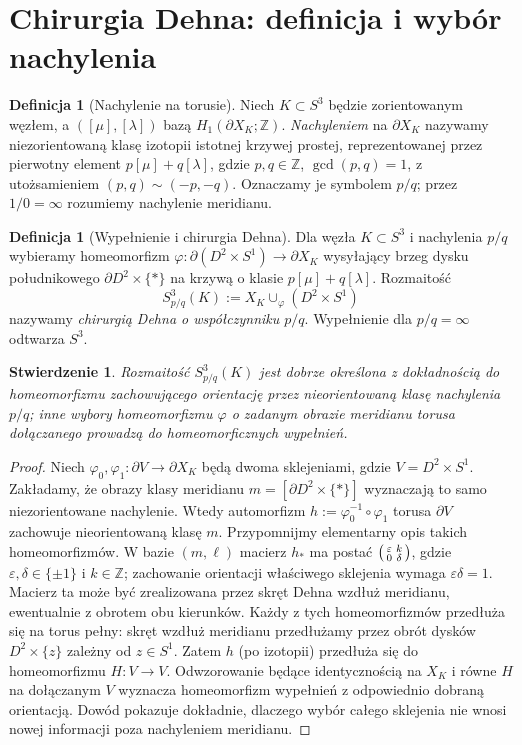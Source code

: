 \documentclass[11pt,a4paper]{report}
\numberwithin{equation}{section}
\theoremstyle{plain}
\newtheorem{stwierdzenie}[twierdzenie]{Stwierdzenie}
\theoremstyle{definition}
\newtheorem{definicja}[twierdzenie]{Definicja}
\theoremstyle{remark}
\begin{document}
\section{Chirurgia Dehna: definicja i wybór nachylenia}
\label{sec:kt-dehn}

\begin{definicja}[Nachylenie na torusie]
Niech $K\subset S^3$ będzie zorientowanym węzłem, a
$([\mu],[\lambda])$ bazą $H_1(\partial X_K;\mathbb Z)$.
\emph{Nachyleniem} na $\partial X_K$ nazywamy niezorientowaną
klasę izotopii istotnej krzywej prostej, reprezentowanej przez
pierwotny element $p[\mu]+q[\lambda]$, gdzie
$p,q\in\mathbb Z$, $\gcd(p,q)=1$, z utożsamieniem
$(p,q)\sim(-p,-q)$. Oznaczamy je symbolem $p/q$;
przez $1/0=\infty$ rozumiemy nachylenie meridianu.
\end{definicja}

\begin{definicja}[Wypełnienie i chirurgia Dehna]
Dla węzła $K\subset S^3$ i nachylenia $p/q$ wybieramy
homeomorfizm $\varphi\colon\partial(D^2\times S^1)
\to\partial X_K$ wysyłający brzeg dysku południkowego
$\partial D^2\times\{*\}$ na krzywą o klasie
$p[\mu]+q[\lambda]$. Rozmaitość
\[
S^3_{p/q}(K):=X_K\cup_\varphi(D^2\times S^1)
\]
nazywamy \emph{chirurgią Dehna o współczynniku $p/q$}.
Wypełnienie dla $p/q=\infty$ odtwarza $S^3$.
\end{definicja}

\begin{stwierdzenie}
Rozmaitość $S^3_{p/q}(K)$ jest dobrze określona z dokładnością
do homeomorfizmu zachowującego orientację przez nieorientowaną
klasę nachylenia $p/q$; inne wybory homeomorfizmu
$\varphi$ o zadanym obrazie meridianu torusa dołączanego
prowadzą do homeomorficznych wypełnień.
\end{stwierdzenie}

\begin{proof}
Niech $\varphi_0,\varphi_1:\partial V\to\partial X_K$
będą dwoma sklejeniami, gdzie $V=D^2\times S^1$.
Zakładamy, że obrazy klasy meridianu $m=[\partial D^2\times\{*\}]$
wyznaczają to samo niezorientowane nachylenie. Wtedy
automorfizm $h:=\varphi_0^{-1}\circ\varphi_1$ torusa
$\partial V$ zachowuje nieorientowaną klasę $m$.
Przypomnijmy elementarny opis takich homeomorfizmów.
W bazie $(m,\ell)$ macierz $h_*$ ma postać
$\begin{psmallmatrix}\varepsilon & k\\ 0 & \delta\end{psmallmatrix}$,
gdzie $\varepsilon,\delta\in\{\pm1\}$ i $k\in\mathbb Z$;
zachowanie orientacji właściwego sklejenia wymaga
$\varepsilon\delta=1$. Macierz ta może być zrealizowana
przez skręt Dehna wzdłuż meridianu, ewentualnie z obrotem
obu kierunków. Każdy z tych homeomorfizmów przedłuża się
na torus pełny: skręt wzdłuż meridianu przedłużamy
przez obrót dysków $D^2\times\{z\}$ zależny od $z\in S^1$.
Zatem $h$ (po izotopii) przedłuża się do homeomorfizmu
$H:V\to V$. Odwzorowanie będące identycznością na $X_K$
i równe $H$ na dołączanym $V$ wyznacza homeomorfizm
wypełnień z odpowiednio dobraną orientacją.
Dowód pokazuje dokładnie, dlaczego wybór całego sklejenia
nie wnosi nowej informacji poza nachyleniem meridianu.
\end{proof}
\end{document}
